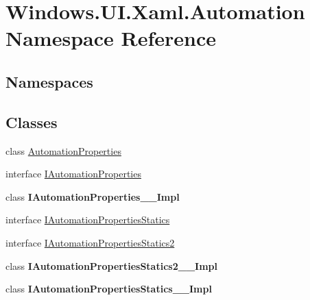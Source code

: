 \hypertarget{namespace_windows_1_1_u_i_1_1_xaml_1_1_automation}{}\section{Windows.\+U\+I.\+Xaml.\+Automation Namespace Reference}
\label{namespace_windows_1_1_u_i_1_1_xaml_1_1_automation}
\subsection*{Namespaces}
\begin{DoxyCompactItemize}
\end{DoxyCompactItemize}
\subsection*{Classes}
\begin{DoxyCompactItemize}
\item 
class \hyperlink{class_windows_1_1_u_i_1_1_xaml_1_1_automation_1_1_automation_properties}{Automation\+Properties}
\item 
interface \hyperlink{interface_windows_1_1_u_i_1_1_xaml_1_1_automation_1_1_i_automation_properties}{I\+Automation\+Properties}
\item 
class {\bfseries I\+Automation\+Properties\+\_\+\+\_\+\+Impl}
\item 
interface \hyperlink{interface_windows_1_1_u_i_1_1_xaml_1_1_automation_1_1_i_automation_properties_statics}{I\+Automation\+Properties\+Statics}
\item 
interface \hyperlink{interface_windows_1_1_u_i_1_1_xaml_1_1_automation_1_1_i_automation_properties_statics2}{I\+Automation\+Properties\+Statics2}
\item 
class {\bfseries I\+Automation\+Properties\+Statics2\+\_\+\+\_\+\+Impl}
\item 
class {\bfseries I\+Automation\+Properties\+Statics\+\_\+\+\_\+\+Impl}
\end{DoxyCompactItemize}
